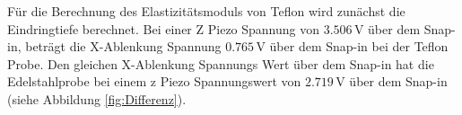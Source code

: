 \begin{table}
    \centering
    \caption{Ermittelte Werte für Snap-in und Pull-off für Edelstahl, Silizium und Teflon. Außerdem sind die errechneten Werte für die Höhendifferenz und die Adhäsionskraft eingetragen.}
    \label{tab:KraftAbstand}
\end{table}

%
%
%
%
%
%
Für die Berechnung des Elastizitätsmoduls von Teflon wird zunächst die Eindringtiefe berechnet.
Bei einer Z Piezo Spannung von $3.506\,\si{\volt}$ über dem Snap-in,
beträgt die X-Ablenkung Spannung $0.765\,\si{\volt}$ über dem Snap-in bei der Teflon Probe.
Den gleichen X-Ablenkung Spannungs Wert über dem Snap-in hat die Edelstahlprobe bei einem z Piezo Spannungswert von $2.719\,\si{\volt}$ über dem Snap-in (siehe Abbildung \ref{fig:Differenz}).

